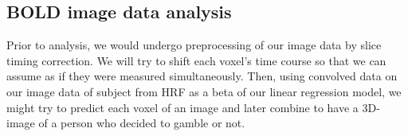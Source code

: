 \subsection{BOLD image data analysis}
Prior to analysis, we would undergo preprocessing of our image data by slice timing correction. We will try to shift each voxel’s time course so that we can assume as if they were measured simultaneously. Then, using convolved data on our image data of subject from HRF as a beta of our linear regression model, we might try to predict each voxel of an image and later combine to have a 3D-image of a person who decided to gamble or not.

